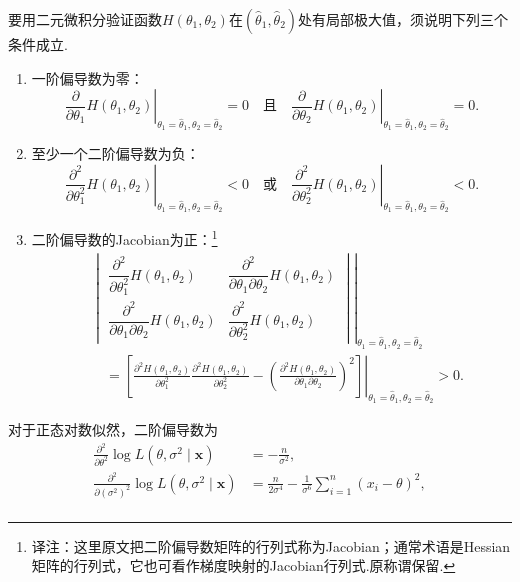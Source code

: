 \begin{example}[续\autoref{ex:7.2.11}]\label{ex:7.2.12}
要用二元微积分验证函数$H(\theta_1,\theta_2)$在$(\widehat\theta_1,\widehat\theta_2)$处有局部极大值，须说明下列三个条件成立.
\begin{enumerate}[label=(\alph*)]
\item{}\label{itm:ex:7.2.12:a} 一阶偏导数为零：
$$\left.\frac\partial{\partial\theta_1}H(\theta_1,\theta_2)\right|_{\theta_1=\widehat\theta_1,\theta_2=\widehat\theta_2}=0\quad\text{且}\quad\left.\frac\partial{\partial\theta_2}H(\theta_1,\theta_2)\right|_{\theta_1=\widehat\theta_1,\theta_2=\widehat\theta_2}=0.$$
\item{}\label{itm:ex:7.2.12:b} 至少一个二阶偏导数为负：
$$\left.\frac{\partial^2}{\partial\theta_1^2}H(\theta_1,\theta_2)\right|_{\theta_1=\widehat\theta_1,\theta_2=\widehat\theta_2}<0\quad\text{或}\quad\left.\frac{\partial^2}{\partial\theta_2^2}H(\theta_1,\theta_2)\right|_{\theta_1=\widehat\theta_1,\theta_2=\widehat\theta_2}<0.$$
\item{}\label{itm:ex:7.2.12:c} 二阶偏导数的Jacobian为正：\footnote{译注：这里原文把二阶偏导数矩阵的行列式称为Jacobian；通常术语是Hessian矩阵的行列式，它也可看作梯度映射的Jacobian行列式.原称谓保留.}
\begin{align*}
&\left.\begin{vmatrix}
\dfrac{\partial^2}{\partial\theta_1^2}H(\theta_1,\theta_2)&\dfrac{\partial^2}{\partial\theta_1\partial\theta_2}H(\theta_1,\theta_2)\\[4pt]
\dfrac{\partial^2}{\partial\theta_1\partial\theta_2}H(\theta_1,\theta_2)&\dfrac{\partial^2}{\partial\theta_2^2}H(\theta_1,\theta_2)
\end{vmatrix}\right|_{\theta_1=\widehat\theta_1,\theta_2=\widehat\theta_2}\\
&\quad=\left.\left[\frac{\partial^2H(\theta_1,\theta_2)}{\partial\theta_1^2}\frac{\partial^2H(\theta_1,\theta_2)}{\partial\theta_2^2}-\left(\frac{\partial^2H(\theta_1,\theta_2)}{\partial\theta_1\partial\theta_2}\right)^2\right]\right|_{\theta_1=\widehat\theta_1,\theta_2=\widehat\theta_2}>0.
\end{align*}
\end{enumerate}
对于正态对数似然，二阶偏导数为
\begin{align*}
\frac{\partial^2}{\partial\theta^2}\log L(\theta,\sigma^2\mid\boldsymbol x)&=-\frac n{\sigma^2},\\
\frac{\partial^2}{\partial(\sigma^2)^2}\log L(\theta,\sigma^2\mid\boldsymbol x)&=\frac n{2\sigma^4}-\frac1{\sigma^6}\sum_{i=1}^n(x_i-\theta)^2,\\

\end{align*}
\end{example}
